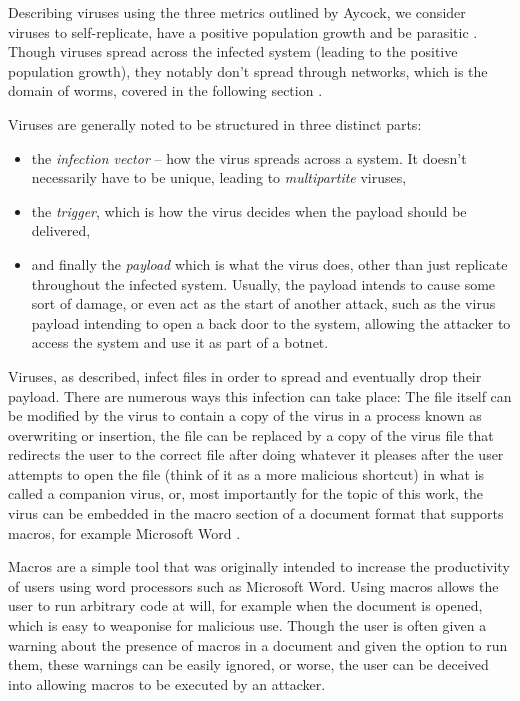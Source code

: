 Describing viruses using the three metrics outlined by Aycock, we consider viruses to self-replicate, have a positive 
population growth and be parasitic \cite[p.~14]{aycock-book}. Though viruses spread across the infected system 
(leading to the positive population growth), they notably don't spread through networks, which is the domain of worms, 
covered in the following section \cite[p.~15]{aycock-book}.

Viruses are generally noted to be structured in three distinct parts: 
\begin{itemize}
  \item the \emph{infection vector} -- how the virus spreads across a system. It doesn't necessarily have to be unique,
    leading to \emph{multipartite} viruses, 
  \item the \emph{trigger}, which is how the virus decides when the payload should be delivered,
  \item and finally the \emph{payload} which is what the virus does, other than just replicate throughout the infected
    system. Usually, the payload intends to cause some sort of damage, or even act as the start of another attack, such
    as the virus payload intending to open a back door to the system, allowing the attacker to access the system and use
    it as part of a botnet.
\end{itemize}
\cite[p.~7, p.~27]{viruses-revealed-book,aycock-book} %

Viruses, as described, infect files in order to spread and eventually drop their payload. There are numerous ways this
infection can take place: The file itself can be modified by the virus to contain a copy of the virus in a process known
as overwriting or insertion, the file can be replaced by a copy of the virus file that redirects the user to the
correct file after doing whatever it pleases after the user attempts to open the file (think of it as a more malicious 
shortcut) in what is called a companion virus, or, most importantly for the topic of this work, the virus can be
embedded in the macro section of a document format that supports macros, for example Microsoft Word \cite{aycock-book,
skoudis-book}. 

Macros are a simple tool that was originally intended to increase the productivity of users using word
processors such as Microsoft Word. Using macros allows the user to run arbitrary code at will, for example when the
document is opened, which is easy to weaponise for malicious use. Though the user is often given a warning about the
presence of macros in a document and given the option to run them, these warnings can be easily ignored, or worse, the
user can be deceived into allowing macros to be executed by an attacker.

